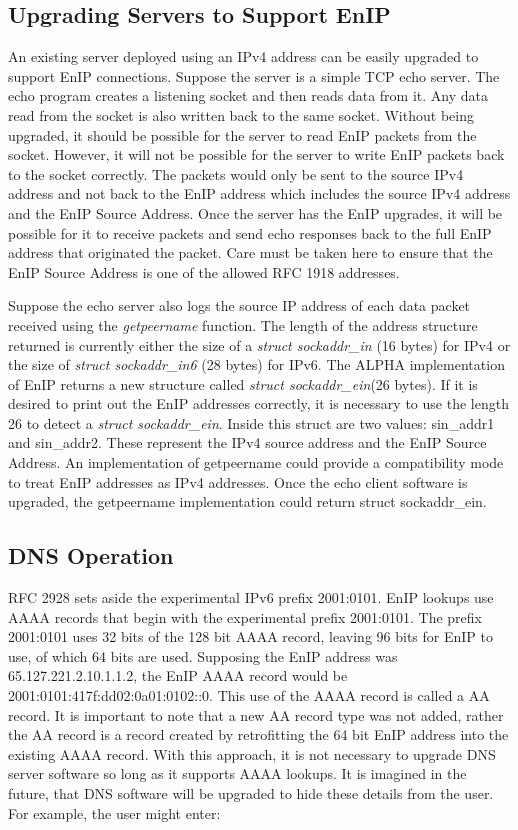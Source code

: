 \subsection{Upgrading Servers to Support EnIP}
An existing server deployed using an IPv4 address can be easily upgraded to support EnIP connections.
Suppose the server is a simple TCP echo server\cite{rfc862}.  The echo program creates a listening socket and then reads data from it.
Any data read from the socket is also written back to the same socket.  Without being upgraded, it should
be possible for the server to read EnIP packets from the socket.  However, it will not be possible for the server
to write EnIP packets back to the socket correctly.  The packets would only be sent to the source IPv4 address and not
back to the EnIP address which includes the source IPv4 address and the EnIP Source Address.  Once the server
has the EnIP upgrades, it will be possible for it to receive packets and send echo responses back to the full EnIP 
address that originated the packet.  Care must be taken here to ensure that the EnIP Source Address is one of the 
allowed RFC 1918 addresses.  

Suppose the echo server also logs the source IP address of each data packet received using the \textit{getpeername}
function.  The length of the address structure returned is currently either the size of a \textit{struct sockaddr\_in} (16 bytes) for IPv4
or the size of \textit{struct sockaddr\_in6} (28 bytes) for IPv6.  The ALPHA implementation of EnIP returns a new structure called
\textit{struct sockaddr\_ein}(26 bytes).  If it is desired to print out the EnIP addresses correctly, it is necessary to 
use the length 26 to detect a \textit{struct sockaddr\_ein}.  Inside this struct are two values: sin\_addr1 and sin\_addr2.  These
represent the IPv4 source address and the EnIP Source Address.  An implementation of getpeername could provide a compatibility
mode to treat EnIP addresses as IPv4 addresses.  Once the echo client software is upgraded, the getpeername implementation could
return struct sockaddr\_ein.

\subsection{DNS Operation}
RFC 2928 sets aside\cite{rfc4727} the experimental IPv6 prefix 2001:0101.  
EnIP lookups use AAAA records that begin with the experimental prefix 2001:0101.  
The prefix 2001:0101 uses 32 bits of the 128 bit AAAA record, leaving 96 bits for EnIP to 
use, of which 64 bits are used.
Supposing the EnIP address was 65.127.221.2.10.1.1.2, the EnIP AAAA record would be 2001:0101:417f:dd02:0a01:0102::0.
This use of the AAAA record is called a AA record.  It is important to note that a new AA record type was not added, rather
the AA record is a record created by retrofitting the 64 bit EnIP address into the existing AAAA record.  
With this approach, it is not necessary to upgrade DNS server software so long as it supports AAAA lookups.
It is imagined in the future, that DNS software will be upgraded to hide these details from the user.  For example,
the user might enter:

